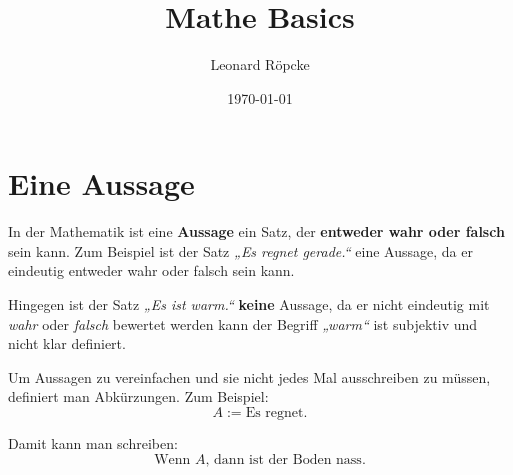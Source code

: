 \documentclass[12pt,a4paper]{article}
\title{Mathe Basics}
\author{Leonard Röpcke}
\date{\today}
\begin{document}
\maketitle
\tableofcontents
\newpage

\section{Eine Aussage}

In der Mathematik ist eine \textbf{Aussage} ein Satz, der \textbf{entweder wahr oder falsch} sein kann. 
Zum Beispiel ist der Satz 
\textit{„Es regnet gerade.“} 
eine Aussage, da er eindeutig entweder wahr oder falsch sein kann.

Hingegen ist der Satz 
\textit{„Es ist warm.“} 
\textbf{keine} Aussage, da er nicht eindeutig mit \textit{wahr} oder \textit{falsch} bewertet werden kann 
der Begriff \textit{„warm“} ist subjektiv und nicht klar definiert.

Um Aussagen zu vereinfachen und sie nicht jedes Mal ausschreiben zu müssen, 
definiert man Abkürzungen. Zum Beispiel:
\[
A := \text{Es regnet.}
\]

Damit kann man schreiben:
\[
\text{Wenn } A \text{, dann ist der Boden nass.}
\]
\end{document}
